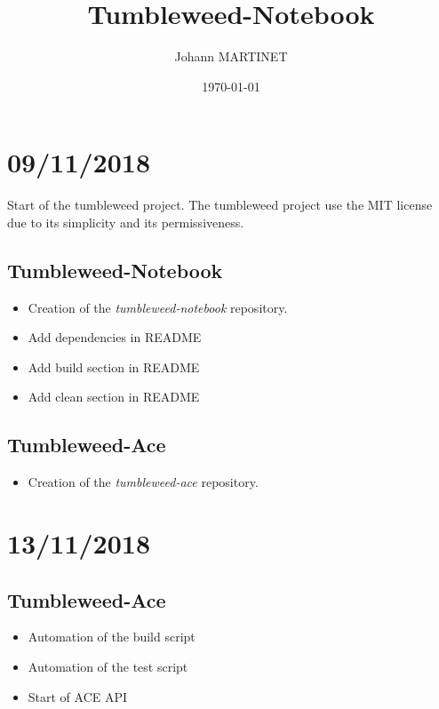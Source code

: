 

\title{Tumbleweed-Notebook}
\author{Johann MARTINET}
\date{\today}


\maketitle

\section*{09/11/2018}%
\label{sec:09_11_2018}

Start of the tumbleweed project.
The tumbleweed project use the MIT license due to its simplicity and its permissiveness.

\subsection*{Tumbleweed-Notebook}%
\begin{itemize}
        \item Creation of the \emph{tumbleweed-notebook} repository.
        \item Add dependencies in README
        \item Add build section in README
        \item Add clean section in README
\end{itemize}

\subsection*{Tumbleweed-Ace}%
\begin{itemize}
        \item Creation of the \emph{tumbleweed-ace} repository.
\end{itemize}

\section*{13/11/2018}%
\label{sec:13_11_2018}

\subsection*{Tumbleweed-Ace}%
\begin{itemize}
        \item Automation of the build script
        \item Automation of the test script
        \item Start of ACE API
\end{itemize}

